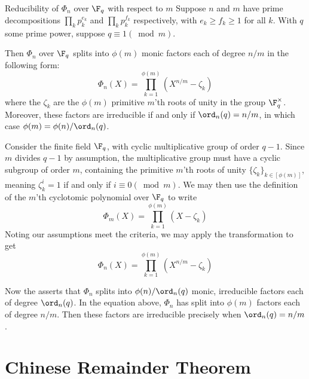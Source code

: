 \begin{corollary}{Reducibility of $\Phi_n$ over $\F_q$ with respect to $m$}
    Suppose $n$ and $m$ have prime decompositions $\prod_k p_k^{e_k}$ and $\prod_k p_k^{f_k}$ respectively, with $e_k\geq f_k\geq 1$ for all $k$.
    With $q$ some prime power, suppose $q\equiv1(\bmod m)$.

    Then $\Phi_n$ over $\F_q$ splits into $\phi(m)$ monic factors each of degree $n/m$ in the following form:
    \begin{equation}
        \Phi_n(X) = \prod_{k=1}^{\phi(m)} \left(X^{n/m}-\zeta_k\right)
    \end{equation}
    where the $\zeta_k$ are the $\phi(m)$ primitive $m$'th roots of unity in the group $\F_q^\times$.
    Moreover, these factors are irreducible if and only if $\ord_n(q) = n/m$, in which case $\phi(m)=\phi(n)/\ord_n(q)$.

    \proof
    Consider the finite field $\F_q$, with cyclic multiplicative group of order $q-1$.
    Since $m$ divides $q-1$ by assumption, the multiplicative group must have a cyclic subgroup of order $m$, containing the primitive $m$'th roots of unity $\{\zeta_k\}_{k\in[\phi(m)]}$, meaning $\zeta_k^i=1$ if and only if $i\equiv0(\bmod m)$.
    We may then use the definition of the $m$'th cyclotomic polynomial over $\F_q$ to write
    \begin{equation}
        \Phi_m(X) = \prod_{k=1}^{\phi(m)} \left(X-\zeta_k\right)
    \end{equation}
    Noting our assumptions meet the criteria, we may apply the transformation  to get
    \begin{equation}
        \Phi_n(X) = \prod_{k=1}^{\phi(m)} \left(X^{n/m}-\zeta_k\right)
    \end{equation}

    Now the  asserts that $\Phi_n$ splits into $\phi(n)/\ord_n(q)$ monic, irreducible factors each of degree $\ord_n(q)$.
    In the equation above, $\Phi_n$ has split into $\phi(m)$ factors each of degree $n/m$.
    Then these factors are irreducible precisely when $\ord_n(q)=n/m$.
\end{corollary}


\section{Chinese Remainder Theorem}

